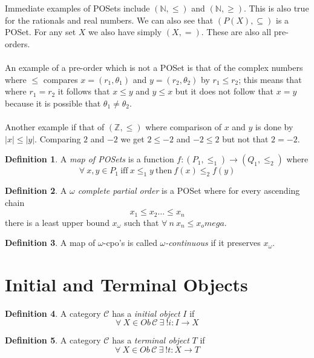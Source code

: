 \documentclass{article}
\theoremstyle{definition}
\newtheorem{definition}{Definition}[section]
\begin{document}
Immediate examples of POSets include $(\mathbb{N},\leq)$ and $(\mathbb{N},\geq)$.
This is also true for the rationals and real numbers.
We can also see that $(P(X), \subseteq)$ is a POSet.
For any set $X$ we also have simply $(X,=)$.
These are also all pre-orders.
\\ \\
An example of a pre-order which is not a POSet is that of the complex numbers
where $\leq$ compares $x = (r_1,\theta_1)$ and $y = (r_2,\theta_2)$ by $r_1 \leq r_2$;
this means that where $r_1 = r_2$ it follows that $x \leq y$ and $y \leq x$
but it does not follow that $x = y$ because it is possible that $\theta_1 \neq \theta_2$.
\\ \\
Another example if that of $(\mathbb{Z},\leq)$ where comparison of $x$ and $y$ is done by
$|x| \leq |y|$.
Comparing $2$ and $-2$ we get $2 \leq -2$ and $-2 \leq 2$ but not that $2 = -2$.

\begin{definition}
    A \textit{map of POSets} is a function $f : (P_1,\leq_1) \rightarrow (Q_1,\leq_2)$ where
    $$\forall\ x,y \in P_1\ \textrm{iff}\ x \leq_1 y\ \textrm{then}\ f(x) \leq_2 f(y)$$
\end{definition}

\begin{definition}
    A \textit{$\omega$ complete partial order} is a POSet where for every ascending chain
    $$x_1 \leq x_2 \dots \leq x_n$$
    there is a least upper bound $x_\omega$ such that $\forall\ n\ x_n \leq x_omega$.
\end{definition}

\begin{definition}
    A map of $\omega$-cpo's is called \textit{$\omega$-continuous}
    if it preserves $x_\omega$.
\end{definition}

\pagebreak
\section{Initial and Terminal Objects}

\begin{definition}
    A category $\mathcal{C}$ has a \textit{initial object} $I$ if
    $$\forall\ X \in Ob\,\mathcal{C}\ \exists\ !i : I \rightarrow X$$
\end{definition}

\begin{definition}
    A category $\mathcal{C}$ has a \textit{terminal object} $T$ if
    $$\forall\ X \in Ob\,\mathcal{C}\ \exists\ !t : X \rightarrow T$$
\end{definition}
\end{document}
